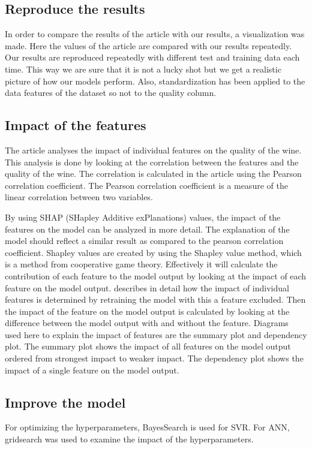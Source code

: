 \documentclass{article}
\begin{document}
\subsection{Reproduce the results}
In order to compare the results of the article with our results, a visualization was made. Here the values of the article \cite{dahal2021prediction} are compared with our results repeatedly. Our results are reproduced repeatedly with different test and training data each time. This way we are sure that it is not a lucky shot but we get a realistic picture of how our models perform.
Also, standardization has been applied to the data features of the dataset so not to the quality column.

\subsection{Impact of the features}
The article analyses the impact of individual features on the quality of the wine.
This analysis is done by looking at the correlation between the features and the quality of the wine.
The correlation is calculated in the article using the Pearson correlation coefficient.
The Pearson correlation coefficient is a measure of the linear correlation between two variables.

By using SHAP (SHapley Additive exPlanations) values, the impact of the features on the model can be analyzed in more detail.
The explanation of the model should reflect a similar result as compared to the pearson correlation coefficient.
Shapley values are created by using the Shapley value method, which is a method from cooperative game theory. Effectively it will calculate the contribution of each feature to the model output by looking at the impact of each feature on the model output.
\cite{lundberg2017unified} describes in detail how the impact of individual features is determined by retraining the model with this a feature excluded.
Then the impact of the feature on the model output is calculated by looking at the difference between the model output with and without the feature.
Diagrams used here to explain the impact of features are the summary plot and dependency plot.
The summary plot shows the impact of all features on the model output ordered from strongest impact to weaker impact.
The dependency plot shows the impact of a single feature on the model output.

\subsection{Improve the model}
For optimizing the hyperparameters, BayesSearch is used for SVR. For ANN, gridsearch was used to examine the impact of the hyperparameters.
\end{document}

